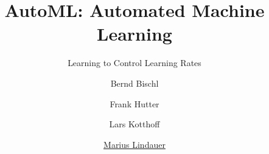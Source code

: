 




\title[AutoML: Learning to Control]{AutoML: Automated Machine Learning}
\subtitle{Learning to Control Learning Rates}
\author[Marius Lindauer]{Bernd Bischl \and Frank Hutter \and Lars Kotthoff \and \underline{Marius Lindauer}}
\institute{}
\date{}





	
	\maketitle
	
